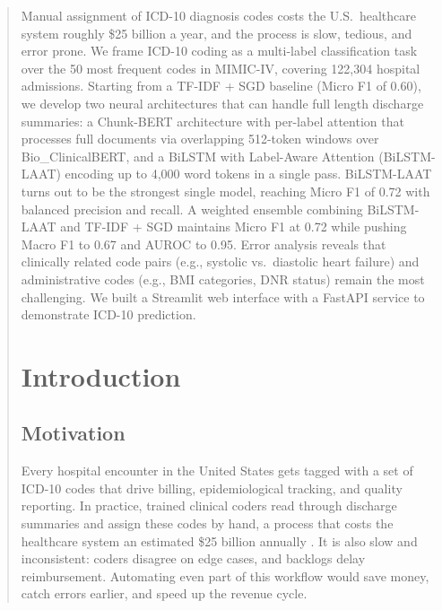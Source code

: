 \documentclass[11pt,a4paper]{article}
\begin{document}
\begin{abstract}
\noindent Manual assignment of ICD-10 diagnosis codes costs the U.S.\ healthcare system roughly \$25 billion a year, and the process is slow, tedious, and error prone. We frame ICD-10 coding as a multi-label classification task over the 50 most frequent codes in MIMIC-IV, covering 122,304 hospital admissions. Starting from a TF-IDF + SGD baseline (Micro F1 of 0.60), we develop two neural architectures that can handle full length discharge summaries: a Chunk-BERT architecture with per-label attention that processes full documents via overlapping 512-token windows over Bio\_ClinicalBERT, and a BiLSTM with Label-Aware Attention (BiLSTM-LAAT) encoding up to 4,000 word tokens in a single pass. BiLSTM-LAAT turns out to be the strongest single model, reaching Micro F1 of 0.72 with balanced precision and recall. A weighted ensemble combining BiLSTM-LAAT and TF-IDF + SGD maintains Micro F1 at 0.72 while pushing Macro F1 to 0.67 and AUROC to 0.95. Error analysis reveals that clinically related code pairs (e.g., systolic vs.\ diastolic heart failure) and administrative codes (e.g., BMI categories, DNR status) remain the most challenging. We built a Streamlit web interface with a FastAPI service to demonstrate ICD-10 prediction.

\section{Introduction}

\subsection{Motivation}
Every hospital encounter in the United States gets tagged with a set of ICD-10 codes that drive billing, epidemiological tracking, and quality reporting. In practice, trained clinical coders read through discharge summaries and assign these codes by hand, a process that costs the healthcare system an estimated \$25 billion annually \cite{mullenbach2018explainable}. It is also slow and inconsistent: coders disagree on edge cases, and backlogs delay reimbursement. Automating even part of this workflow would save money, catch errors earlier, and speed up the revenue cycle.


\end{abstract}
\end{document}
